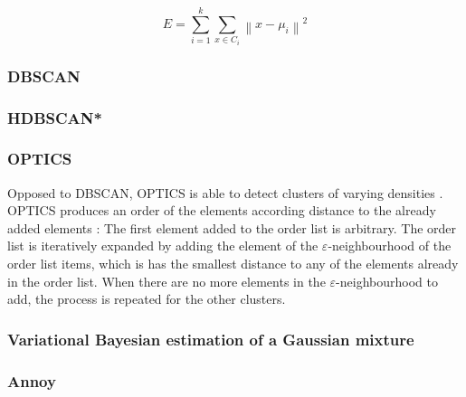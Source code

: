 \begin{equation}
    E = \sum_{i=1}^{k} \sum_{x \in C_{i}}\left\|x-\mu_{i}\right\|^{2}
\label{eq:kmeans-error}
\end{equation}


\subsubsection{DBSCAN}\label{subsec:dbscan}


\subsubsection{HDBSCAN*}\label{subsec:hdbcan}


\subsubsection{OPTICS}\label{subsec:optics}

Opposed to DBSCAN, OPTICS is able to detect clusters of varying densities \cite{OPTICS2014}.
OPTICS produces an order of the elements according distance to the already added elements \cite{OPTICS2014}:
The first element added to the order list is arbitrary.
The order list is iteratively expanded by adding the element of the $\varepsilon$-neighbourhood of the order list items, which is has the smallest distance to any of the elements already in the order list.
When there are no more elements in the $\varepsilon$-neighbourhood to add, the process is repeated for the other clusters.



\subsubsection{Variational Bayesian estimation of a Gaussian mixture}\label{subsec:varbayes}

\subsubsection{Annoy}\label{subsec:annoy}



